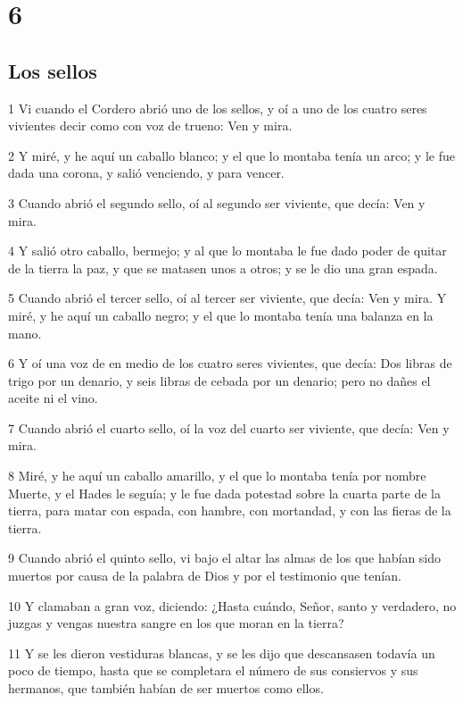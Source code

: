 \chapter{6}

\section*{Los sellos}

\par 1 Vi cuando el Cordero abrió uno de los sellos, y oí a uno de los cuatro seres vivientes decir como con voz de trueno: Ven y mira.
\par 2 Y miré, y he aquí un caballo blanco; y el que lo montaba tenía un arco; y le fue dada una corona, y salió venciendo, y para vencer.
\par 3 Cuando abrió el segundo sello, oí al segundo ser viviente, que decía: Ven y mira.
\par 4 Y salió otro caballo, bermejo; y al que lo montaba le fue dado poder de quitar de la tierra la paz, y que se matasen unos a otros; y se le dio una gran espada.
\par 5 Cuando abrió el tercer sello, oí al tercer ser viviente, que decía: Ven y mira. Y miré, y he aquí un caballo negro; y el que lo montaba tenía una balanza en la mano.
\par 6 Y oí una voz de en medio de los cuatro seres vivientes, que decía: Dos libras de trigo por un denario, y seis libras de cebada por un denario; pero no dañes el aceite ni el vino.
\par 7 Cuando abrió el cuarto sello, oí la voz del cuarto ser viviente, que decía: Ven y mira.
\par 8 Miré, y he aquí un caballo amarillo, y el que lo montaba tenía por nombre Muerte, y el Hades le seguía; y le fue dada potestad sobre la cuarta parte de la tierra, para matar con espada, con hambre, con mortandad, y con las fieras de la tierra.
\par 9 Cuando abrió el quinto sello, vi bajo el altar las almas de los que habían sido muertos por causa de la palabra de Dios y por el testimonio que tenían.
\par 10 Y clamaban a gran voz, diciendo: ¿Hasta cuándo, Señor, santo y verdadero, no juzgas y vengas nuestra sangre en los que moran en la tierra?
\par 11 Y se les dieron vestiduras blancas, y se les dijo que descansasen todavía un poco de tiempo, hasta que se completara el número de sus consiervos y sus hermanos, que también habían de ser muertos como ellos.
